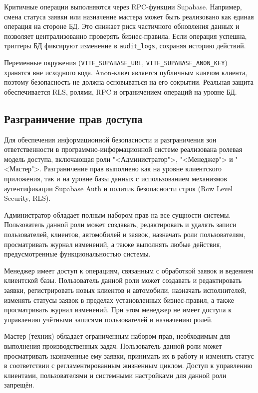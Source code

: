 Критичные операции выполняются через RPC-функции Supabase. Например, смена статуса заявки или назначение мастера может быть реализовано как единая операция на стороне БД. Это снижает риск частичного обновления данных и позволяет централизованно проверять бизнес-правила. Если операция успешна, триггеры БД фиксируют изменение в \texttt{audit\_logs}, сохраняя историю действий.

Переменные окружения (\texttt{VITE\_SUPABASE\_URL}, \texttt{VITE\_SUPABASE\_ANON\_KEY}) хранятся вне исходного кода. Anon-ключ является публичным ключом клиента, поэтому безопасность не должна основываться на его сокрытии. Реальная защита обеспечивается RLS, ролями, RPC и ограничением операций на уровне БД.

\subsection{Разграничение прав доступа}

Для обеспечения информационной безопасности и разграничения зон ответственности в программно-информационной системе реализована ролевая модель доступа, включающая роли "<Администратор">, "<Менеджер"> и "<Мастер">. Разграничение прав выполнено как на уровне клиентского приложения, так и на уровне базы данных с использованием механизмов аутентификации Supabase Auth и политик безопасности строк (Row Level Security, RLS).

Администратор обладает полным набором прав на все сущности системы. Пользователь данной роли может создавать, редактировать и удалять записи пользователей, клиентов, автомобилей и заявок, назначать роли пользователям, просматривать журнал изменений, а также выполнять любые действия, предусмотренные функциональностью системы.

Менеджер имеет доступ к операциям, связанным с обработкой заявок и ведением клиентской базы. Пользователь данной роли может создавать и редактировать заявки, регистрировать новых клиентов и автомобили, назначать исполнителей, изменять статусы заявок в пределах установленных бизнес-правил, а также просматривать журнал изменений. При этом менеджер не имеет доступа к управлению учётными записями пользователей и назначению ролей.

Мастер (техник) обладает ограниченным набором прав, необходимым для выполнения производственных задач. Пользователь данной роли может просматривать назначенные ему заявки, принимать их в работу и изменять статус в соответствии с регламентированным жизненным циклом. Доступ к управлению клиентами, пользователями и системными настройками для данной роли запрещён.

